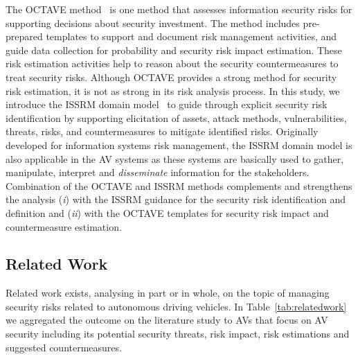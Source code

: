 \documentclass[runningheads]{llncs}
\begin{document}
The OCTAVE method~\cite{CaralliEtAl2007} is one method that assesses information security risks for supporting decisions about security investment. The method includes pre-prepared templates to support and document risk management activities, and guide data collection for probability and security risk impact estimation. These risk estimation activities help to reason about the security countermeasures to treat security risks. Although OCTAVE provides a strong method for security risk estimation, it is not as strong in its risk analysis process. In this study, we introduce the ISSRM domain model~\cite{DuboisEtAl2010} to guide through explicit security risk identification by supporting elicitation of assets, attack methods, vulnerabilities, threats, risks, and countermeasures to mitigate identified risks.
Originally developed for information systems risk management, the ISSRM domain model is also applicable in the AV systems as these systems are basically used to gather, manipulate, interpret and \textit{disseminate} information for the stakeholders. Combination of the OCTAVE and ISSRM methods complements and strengthens the analysis (\textit{i}) with the ISSRM guidance for the security risk identification and definition and (\textit{ii}) with the OCTAVE templates for security risk impact and countermeasure estimation. 

\subsection{Related Work}\label{sec:related}

Related work exists, analysing in part or in whole, on the topic of managing security risks related to autonomous driving vehicles.
%
In Table~\ref{tab:relatedwork} we aggregated the outcome on the literature study to AVs that focus on AV security including its potential security threats, risk impact, risk estimations and suggested countermeasures.
\end{document}
